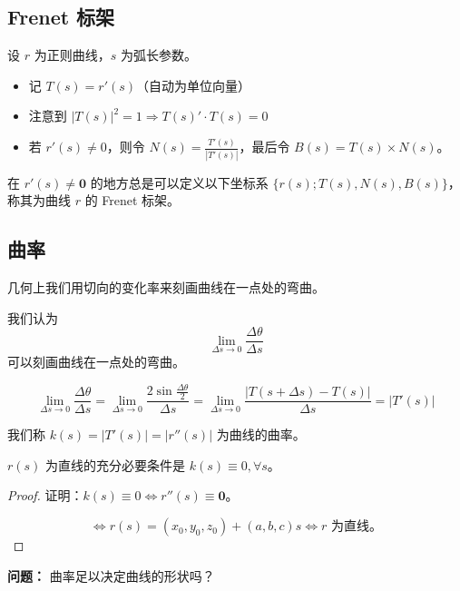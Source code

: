 \documentclass[lang=cn,10pt,thmcnt=section]{elegantbook}
\renewcommand{\vec}[1]{\mathbf{#1}}
\begin{document}
\subsection{Frenet 标架}
\begin{definition}[Frenet 标架]
    设 $r$ 为正则曲线，$s$ 为弧长参数。
    \begin{itemize}
        \item 记 $T(s) = r'(s)$（自动为单位向量）
        \item 注意到 $|T(s)|^2 = 1 \Rightarrow T(s)' \cdot T(s) = 0$
        \item 若 $r'(s) \neq 0$，则令 $N(s) = \frac{T'(s)}{|T'(s)|}$，最后令 $B(s) = T(s) \times N(s)$。
    \end{itemize}
    在 $r'(s) \neq \vec{0}$ 的地方总是可以定义以下坐标系 $\{r(s); T(s), N(s), B(s)\}$，称其为曲线 $r$ 的 Frenet 标架。
\end{definition}
\subsection{曲率}

    几何上我们用切向的变化率来刻画曲线在一点处的弯曲。

    我们认为
    \[
    \lim_{\Delta s \to 0} \frac{\Delta \theta}{\Delta s}
    \]
    可以刻画曲线在一点处的弯曲。

    
\begin{proposition}
    \[
    \lim_{\Delta s \to 0} \frac{\Delta \theta}{\Delta s} = \lim_{\Delta s \to 0} \frac{2 \sin \frac{\Delta \theta}{2}}{\Delta s} = \lim_{\Delta s \to 0} \frac{|T(s + \Delta s) - T(s)|}{\Delta s} = |T'(s)|
    \]
\end{proposition}
\begin{definition}[曲率]
    我们称 $k(s) = |T'(s)| = |r''(s)|$ 为曲线的曲率。
    \end{definition}
    
    \begin{proposition}
    $r(s)$ 为直线的充分必要条件是 $k(s) \equiv 0, \forall s$。
    \end{proposition}
    
    \begin{proof}
    证明：$k(s) \equiv 0 \Leftrightarrow r''(s) \equiv \vec{0}$。
    
    \[
    \Leftrightarrow r(s) = (x_0, y_0, z_0) + (a, b, c)s \Leftrightarrow r \text{ 为直线}。
    \]
    \end{proof}
    
    \textbf{问题：} 曲率足以决定曲线的形状吗？
    
\end{document}
